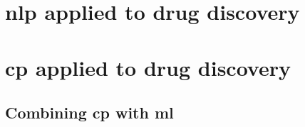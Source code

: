 \documentclass[../Document.tex]{subfiles}
\begin{document}
\label{chap:lit-review}

\section{\acrshort{nlp} applied to drug discovery}
\label{sec:lit-review/nlp}



\section{\acrshort{cp} applied to drug discovery}
\label{sec:lit-review/cp}



\subsection{Combining \acrshort{cp} with \acrshort{ml}}
\label{sec:lit-review/gpt+cp}
\end{document}
